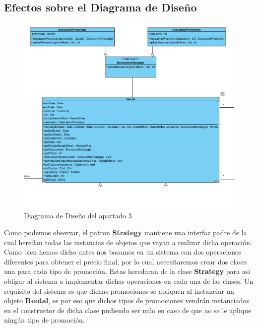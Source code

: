 \subsection{Efectos sobre el Diagrama de Diseño}

\begin{figure}[H]
    \centering
     \includegraphics[width=1\linewidth]{assets/diagramas/UML_Apartado3.png}
     \caption{Diagrama de Diseño del apartado 3}
\end{figure}

Como podemos observar, el patron \textbf{Strategy} mantiene una interfaz padre de la cual heredan todas las instancias de objetos que vayan a realizar dicha operación.
Como bien hemos dicho antes nos basamos en un sistema con dos operaciones diferentes para obtener el precio final, por lo cual necesitaremos crear dos clases una para cada tipo de 
promoción. Estas heredaran de la clase \textbf{Strategy} para asi obligar al sistema a implementar dichas operaciones en cada una de las clases. Un requisito del sistema es que dichas
promociones se apliquen al instanciar un objeto \textbf{Rental}, es por eso que dichos tipos de promociones vendrán instanciados en el constructor de dicha clase pudiendo ser nulo en caso 
de que no se le aplique ningún tipo de promoción.\par
\newpage
